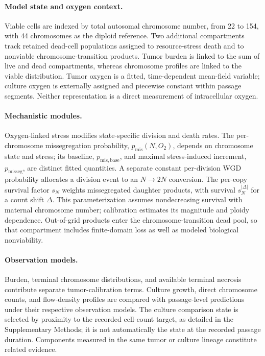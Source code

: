 \documentclass[11pt]{article}
\begin{document}
\paragraph{Model state and oxygen context.}
Viable cells are indexed by total autosomal chromosome number, from 22 to 154, with 44 chromosomes as the diploid reference. Two additional compartments track retained dead-cell populations assigned to resource-stress death and to nonviable chromosome-transition products. Tumor burden is linked to the sum of live and dead compartments, whereas chromosome profiles are linked to the viable distribution. Tumor oxygen is a fitted, time-dependent mean-field variable; culture oxygen is externally assigned and piecewise constant within passage segments. Neither representation is a direct measurement of intracellular oxygen.

\paragraph{Mechanistic modules.}
Oxygen-linked stress modifies state-specific division and death rates. The per-chromosome missegregation probability, $p_{\mathrm{mis}}(N,O_2)$, depends on chromosome state and stress; its baseline, $p_{\mathrm{mis,base}}$, and maximal stress-induced increment, $p_{\mathrm{misseg}}$, are distinct fitted quantities. A separate constant per-division WGD probability allocates a division event to an $N\rightarrow2N$ conversion. The per-copy survival factor $s_N$ weights missegregated daughter products, with survival $s_N^{|\Delta|}$ for a count shift $\Delta$. This parameterization assumes nondecreasing survival with maternal chromosome number; calibration estimates its magnitude and ploidy dependence. Out-of-grid products enter the chromosome-transition dead pool, so that compartment includes finite-domain loss as well as modeled biological nonviability.

\paragraph{Observation models.}
Burden, terminal chromosome distributions, and available terminal necrosis contribute separate tumor-calibration terms. Culture growth, direct chromosome counts, and flow-density profiles are compared with passage-level predictions under their respective observation models. The culture comparison state is selected by proximity to the recorded cell-count target, as detailed in the Supplementary Methods; it is not automatically the state at the recorded passage duration. Components measured in the same tumor or culture lineage constitute related evidence.
\end{document}
